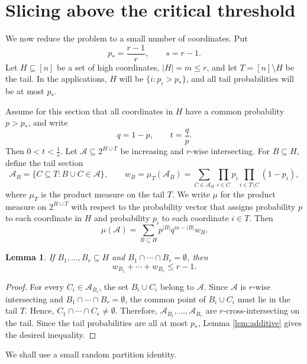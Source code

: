 \documentclass[11pt]{article}
\newtheorem{lemma}[theorem]{Lemma}
\begin{document}
\section{Slicing above the critical threshold}\label{se3}

We now reduce the problem to a small number of coordinates.  Put $$p_*=\frac{r-1}{r},\qquad s=r-1.$$  Let $H\subseteq[n]$ be a set of high coordinates, $|H|=m\le r$,
and let $T=[n]\setminus H$ be the tail.  In the applications, $H$ will be
$\{i:p_i>p_*\}$, and all tail probabilities will be at most $p_*$.

Assume for this section that all coordinates in $H$ have a common probability
$p>p_*$, and write $$q=1-p,\qquad t=\frac{q}{p}.$$  Then $0<t<\frac{1}{s}$.  Let
$\mathcal{A}\subseteq2^{H\cup T}$ be increasing and $r$-wise intersecting.  For
$B\subseteq H$, define the tail section
$$
 \mathcal{A}_B=\{C\subseteq T:B\cup C\in\mathcal{A}\},\qquad
 w_B=\mu_T(\mathcal{A}_B)=\sum_{C\in\mathcal A_B}\prod_{i\in C}p_i\prod_{i\in T\setminus C}(1-p_i),
$$
where $\mu_T$ is the product measure on the tail $T$. We write $\mu$ for the product measure on $2^{H\cup T}$ with respect to the probability vector that assigns probability $p$ to each coordinate in $H$ and probability $p_i$ to each coordinate $i\in T$. 
 Then
\begin{equation}\label{eq:slice-measure}
 \mu(\mathcal{A})=\sum_{B\subseteq H}p^{|B|}q^{m-|B|}w_B.
\end{equation}

\begin{lemma}\label{lem:slice}
If $B_1,\ldots,B_r\subseteq H$ and
$B_1\cap\cdots\cap B_r=\emptyset$, then
$$
 w_{B_1}+\cdots+w_{B_r}\le r-1.
$$
\end{lemma}
\begin{proof}
For every $C_i\in\mathcal{A}_{B_i}$, the set $B_i\cup C_i$ belong to $\mathcal{A}$.  Since
$\mathcal{A}$ is $r$-wise intersecting and $B_1\cap\cdots\cap B_r=\emptyset$, the
common point of $B_i\cup C_i$ must lie in the tail $T$.  Hence,
$C_1\cap\cdots\cap C_r\ne\emptyset$.  Therefore,
$\mathcal{A}_{B_1},\ldots,\mathcal{A}_{B_r}$ are $r$-cross-intersecting on the tail.
Since the tail probabilities are all at most $p_*$,  Lemma \ref{lem:additive} gives
the desired inequality.
\end{proof}


We shall use a small random partition identity.
\end{document}

